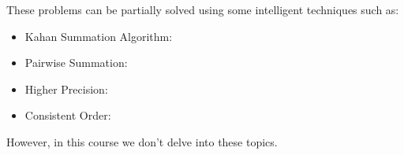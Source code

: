 These problems can be partially solved using some intelligent techniques such as:
\begin{multicols}{2}
    \begin{itemize}
        \item Kahan Summation Algorithm:
        \begin{center}
        \end{center}
        \item Pairwise Summation:
        \begin{center}
        \end{center}
        \item Higher Precision:
        \begin{center}
        \end{center}
        \item Consistent Order:
        \begin{center}
        \end{center}
    \end{itemize}
\end{multicols}
However, in this course we don't delve into these topics.